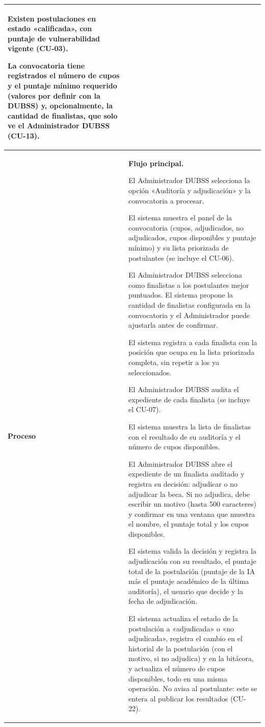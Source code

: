 \begin{longtable}{>{\raggedright\arraybackslash}p{2.9cm} >{\raggedright\arraybackslash}p{12.6cm}}
\begin{cuvin}
    \item Existen postulaciones en estado «calificada», con puntaje de vulnerabilidad vigente (CU-03).
    \item La convocatoria tiene registrados el número de cupos y el puntaje mínimo requerido (valores por definir con la DUBSS) y, opcionalmente, la cantidad de finalistas, que solo ve el Administrador DUBSS (CU-13).
\end{cuvin} \\
\midrule
\textbf{Proceso} & \textbf{Flujo principal.}
\begin{cupasos}
    \item El Administrador DUBSS selecciona la opción «Auditoría y adjudicación» y la convocatoria a procesar.
    \item El sistema muestra el panel de la convocatoria (cupos, adjudicados, no adjudicados, cupos disponibles y puntaje mínimo) y su lista priorizada de postulantes (se incluye el CU-06).
    \item El Administrador DUBSS selecciona como finalistas a los postulantes mejor puntuados. El sistema propone la cantidad de finalistas configurada en la convocatoria y el Administrador puede ajustarla antes de confirmar.
    \item El sistema registra a cada finalista con la posición que ocupa en la lista priorizada completa, sin repetir a los ya seleccionados.
    \item El Administrador DUBSS audita el expediente de cada finalista (se incluye el CU-07).
    \item El sistema muestra la lista de finalistas con el resultado de su auditoría y el número de cupos disponibles.
    \item El Administrador DUBSS abre el expediente de un finalista auditado y registra su decisión: adjudicar o no adjudicar la beca. Si no adjudica, debe escribir un motivo (hasta 500 caracteres) y confirmar en una ventana que muestra el nombre, el puntaje total y los cupos disponibles.
    \item El sistema valida la decisión y registra la adjudicación con su resultado, el puntaje total de la postulación (puntaje de la IA más el puntaje académico de la última auditoría), el usuario que decide y la fecha de adjudicación.
    \item El sistema actualiza el estado de la postulación a «adjudicada» o «no adjudicada», registra el cambio en el historial de la postulación (con el motivo, si no adjudica) y en la bitácora, y actualiza el número de cupos disponibles, todo en una misma operación. No avisa al postulante: este se entera al publicar los resultados (CU-22).

\end{cupasos}
\end{longtable}
